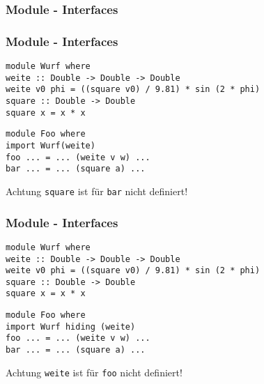 \documentclass[fleqn,11pt,aspectratio=43]{beamer}
\begin{document}
\begin{frame}
\frametitle{Module - Interfaces}
\end{frame}

\begin{frame}[fragile]
\frametitle{Module - Interfaces} 
\begin{lstlisting}
module Wurf where
weite :: Double -> Double -> Double
weite v0 phi = ((square v0) / 9.81) * sin (2 * phi)
square :: Double -> Double
square x = x * x
\end{lstlisting}
\begin{lstlisting}
module Foo where
import Wurf(weite)
foo ... = ... (weite v w) ...
bar ... = ... (square a) ...
\end{lstlisting}
\begin{alertblock}{Achtung}
\lstinline|square| ist für \lstinline|bar| nicht definiert!
\end{alertblock}
\end{frame}

\begin{frame}[fragile]
\frametitle{Module - Interfaces} 
\begin{lstlisting}
module Wurf where
weite :: Double -> Double -> Double
weite v0 phi = ((square v0) / 9.81) * sin (2 * phi)
square :: Double -> Double
square x = x * x
\end{lstlisting}
\begin{lstlisting}
module Foo where
import Wurf hiding (weite)
foo ... = ... (weite v w) ...
bar ... = ... (square a) ...
\end{lstlisting}
\begin{alertblock}{Achtung}
\lstinline|weite| ist für \lstinline|foo| nicht definiert!
\end{alertblock}
\end{frame}
\end{document}
